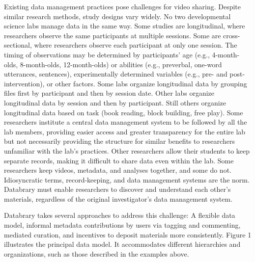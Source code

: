 \documentclass{sig-alternate}
\begin{document}
Existing data management practices pose challenges for video sharing.
Despite similar research methods, study designs vary widely. No two
developmental science labs manage data in the same way. Some studies are
longitudinal, where researchers observe the same participants at
multiple sessions. Some are cross-sectional, where researchers observe
each participant at only one session. The timing of observations may be
determined by participants’ age (e.g., 4-month-olds, 8-month-olds,
12-month-olds) or abilities (e.g., preverbal, one-word utterances,
sentences), experimentally determined variables (e.g., pre- and
post-intervention), or other factors. Some labs organize longitudinal
data by grouping files first by participant and then by session date.
Other labs organize longitudinal data by session and then by
participant. Still others organize longitudinal data based on task (book
reading, block building, free play). Some researchers institute a
central data management system to be followed by all the lab members,
providing easier access and greater transparency for the entire lab but
not necessarily providing the structure for similar benefits to
researchers unfamiliar with the lab’s practices. Other researchers allow
their students to keep separate records, making it difficult to share
data even within the lab. Some researchers keep videos, metadata, and
analyses together, and some do not. Idiosyncratic terms, record-keeping,
and data management systems are the norm. Databrary must enable
researchers to discover and understand each other’s materials,
regardless of the original investigator’s data management system.

Databrary takes several approaches to address this challenge: A flexible
data model, informal metadata contributions by users via tagging and
commenting, mediated curation, and incentives to deposit materials more
consistently. Figure 1 illustrates the principal data model. It
accommodates different hierarchies and organizations, such as those
described in the examples above.
\end{document}
